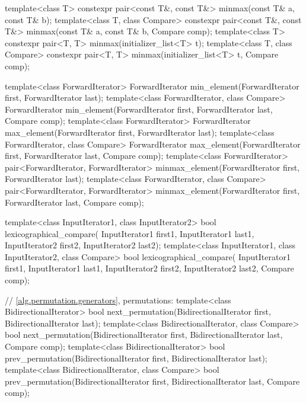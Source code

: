 \begin{codeblock}
{  template<class T> constexpr pair<const T&, const T&> minmax(const T& a, const T& b);
  template<class T, class Compare>
    constexpr pair<const T&, const T&> minmax(const T& a, const T& b, Compare comp);
  template<class T>
    constexpr pair<T, T> minmax(initializer_list<T> t);
  template<class T, class Compare>
    constexpr pair<T, T> minmax(initializer_list<T> t, Compare comp);

  template<class ForwardIterator>
    ForwardIterator min_element(ForwardIterator first, ForwardIterator last);
  template<class ForwardIterator, class Compare>
    ForwardIterator min_element(ForwardIterator first, ForwardIterator last,
                                Compare comp);
  template<class ForwardIterator>
    ForwardIterator max_element(ForwardIterator first, ForwardIterator last);
  template<class ForwardIterator, class Compare>
    ForwardIterator max_element(ForwardIterator first, ForwardIterator last,
                                Compare comp);
  template<class ForwardIterator>
    pair<ForwardIterator, ForwardIterator>
      minmax_element(ForwardIterator first, ForwardIterator last);
  template<class ForwardIterator, class Compare>
    pair<ForwardIterator, ForwardIterator>
      minmax_element(ForwardIterator first, ForwardIterator last, Compare comp);

  template<class InputIterator1, class InputIterator2>
    bool lexicographical_compare(
      InputIterator1 first1, InputIterator1 last1,
      InputIterator2 first2, InputIterator2 last2);
  template<class InputIterator1, class InputIterator2, class Compare>
    bool lexicographical_compare(
      InputIterator1 first1, InputIterator1 last1,
      InputIterator2 first2, InputIterator2 last2,
      Compare comp);

  // \ref{alg.permutation.generators}, permutations:
  template<class BidirectionalIterator>
    bool next_permutation(BidirectionalIterator first,
                          BidirectionalIterator last);
  template<class BidirectionalIterator, class Compare>
    bool next_permutation(BidirectionalIterator first,
                          BidirectionalIterator last, Compare comp);
  template<class BidirectionalIterator>
    bool prev_permutation(BidirectionalIterator first,
                          BidirectionalIterator last);
  template<class BidirectionalIterator, class Compare>
    bool prev_permutation(BidirectionalIterator first,
                          BidirectionalIterator last, Compare comp);
}
\end{codeblock}

